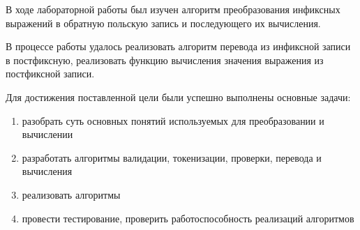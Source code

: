 
В ходе лабораторной работы был изучен алгоритм преобразования инфиксных выражений в обратную польскую запись и последующего их вычисления. 

В процессе работы удалось реализовать алгоритм перевода из инфиксной записи в постфиксную, реализовать функцию вычисления значения выражения из постфиксной записи.

Для достижения поставленной цели были успешно выполнены основные задачи: 
\begin{enumerate}
	\item разобрать суть основных понятий используемых для преобразовании и вычислении
	\item разработать алгоритмы валидации, токенизации, проверки, перевода и вычисления 
	\item реализовать алгоритмы 
	\item провести тестирование, проверить работоспособность реализаций алгоритмов 
\end{enumerate}
